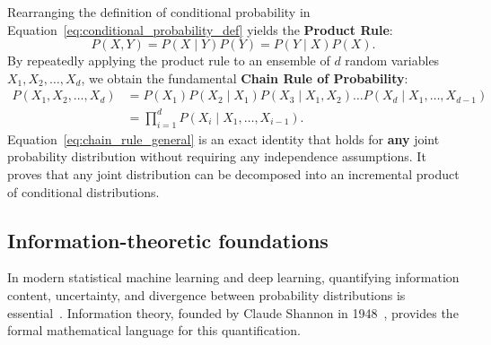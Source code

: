 Rearranging the definition of conditional probability in Equation~\eqref{eq:conditional_probability_def} yields the \textbf{Product Rule}:
\begin{equation}
P(X, Y) = P(X \mid Y) P(Y) = P(Y \mid X) P(X).
\label{eq:product_rule_basic}
\end{equation}
By repeatedly applying the product rule to an ensemble of $d$ random variables $X_1, X_2, \dots, X_d$, we obtain the fundamental \textbf{Chain Rule of Probability}:
\begin{align}
P(X_1, X_2, \dots, X_d) &= P(X_1) P(X_2 \mid X_1) P(X_3 \mid X_1, X_2) \dots P(X_d \mid X_1, \dots, X_{d-1}) \nonumber \\
&= \prod_{i=1}^d P(X_i \mid X_1, \dots, X_{i-1}).
\label{eq:chain_rule_general}
\end{align}
Equation~\eqref{eq:chain_rule_general} is an exact identity that holds for \textbf{any} joint probability distribution without requiring any independence assumptions. It proves that any joint distribution can be decomposed into an incremental product of conditional distributions.

\subsection{Information-theoretic foundations}
\label{sec:information_theory_foundations}

In modern statistical machine learning and deep learning, quantifying information content, uncertainty, and divergence between probability distributions is essential~\cite{goodfellow2016deep,bishop2024deep}. Information theory, founded by Claude Shannon in 1948~\cite{shannon1948mathematical}, provides the formal mathematical language for this quantification.

